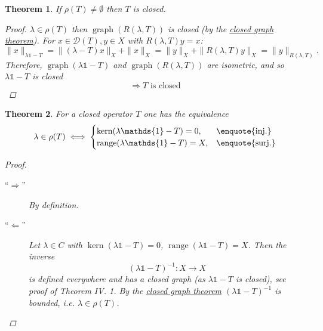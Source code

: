 \documentclass[12pt]{extreport} %
\newcommand{\DO}[1]{\mathcal{D}\left( {#1} \right)}
\theoremstyle{named}
\theoremstyle{nnamed}
\theoremstyle{itshape}
\newtheorem{theorem}{Theorem}  \counterwithin{theorem}{chapter}
\theoremstyle{normal}
\begin{document}
\begin{theorem}
	If $\rho(T) \neq \emptyset$ then $T$ is closed.
	
	\begin{proof}
		$\lambda \in \rho(T)$ then $\operatorname{graph}(R(\lambda, T))$ is closed (by the \hyperref[thm:a.cgt]{closed graph theorem}). For $x \in \DO{T}, y \in X$ with $R(\lambda, T) y = x$:
		$$ \| x \|_{\lambda \mathds{1} - T} = \| (\lambda - T) x \|_X + \| x \|_X = \| y \|_X + \| R(\lambda, T) y \|_X = \| y \|_{R(\lambda, T)}. $$
		Therefore, $\operatorname{graph}(\lambda \mathds{1} - T)$ and $\operatorname{graph}(R(\lambda, T))$ are isometric, and so $\lambda \mathds{1} - T$ is closed 
		$$ \Rightarrow T \text{ is closed} $$
	\end{proof}	
\end{theorem}

\begin{theorem}
	For a closed operator $T$ one has the equivalence
	$$ \lambda \in \rho(T) \iff \begin{cases} \operatorname{kern}(\lambda \mathds{1} - T) = 0, & \text{\enquote{inj.}} \\ \operatorname{range}(\lambda \mathds{1} - T) = X, & \text{\enquote{surj.}}\end{cases} $$
	
	\begin{proof} ~\
		\begin{description}
			\item[\hspace{0.25cm}\enquote{$\Rightarrow$}] By definition.
			\item[\hspace{0.25cm}\enquote{$\Leftarrow$}] Let $\lambda \in C$ with $\operatorname{kern}(\lambda \mathds{1} - T) = 0$, $\operatorname{range}(\lambda \mathds{1} - T) = X$. Then the inverse
			$$ \left( \lambda \mathds{1} - T \right)^{-1} \colon X \rightarrow X $$
			is defined everywhere and has a closed graph (as $\lambda \mathds{1} - T$ is closed), see proof of Theorem IV. 1. By the \hyperref[thm:acgt]{closed graph theorem} $\left( \lambda \mathds{1} - T \right)^{-1}$ is bounded, i.e. $\lambda \in \rho(T)$. 
		\end{description}
	\end{proof}
\end{theorem}
\end{document}
